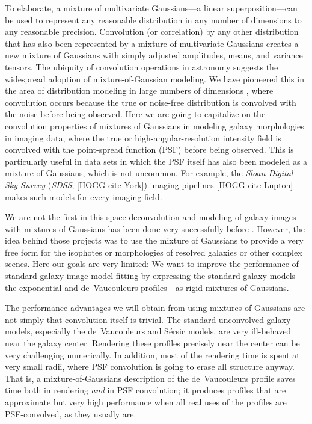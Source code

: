 \documentclass[12pt,pdftex,preprint]{aastex}
\newcommand{\project}[1]{\textsl{#1}}
\newcommand{\sdss}{\project{SDSS}}
\begin{document}
To elaborate, a mixture of multivariate Gaussians---a linear
superposition---can be used to represent any reasonable distribution
in any number of dimensions to any reasonable precision.  Convolution
(or correlation) by any other distribution that has also been
represented by a mixture of multivariate Gaussians creates a new
mixture of Gaussians with simply adjusted amplitudes, means, and
variance tensors.  The ubiquity of convolution operations in astronomy
suggests the widespread adoption of mixture-of-Gaussian modeling.  We
have pioneered this in the area of distribution modeling in large
numbers of dimensions \citep{xd, xdqso, xdqsoz}, where convolution
occurs because the true or noise-free distribution is convolved with
the noise before being observed.  Here we are going to capitalize on
the convolution properties of mixtures of Gaussians in modeling galaxy
morphologies in imaging data, where the true or
high-angular-resolution intensity field is convolved with the
point-spread function (PSF) before being observed.  This is
particularly useful in data sets in which the PSF itself has also been
modeled as a mixture of Gaussians, which is not uncommon.  For
example, the \project{Sloan Digital Sky Survey} (\sdss; [HOGG cite
  York]) imaging pipelines [HOGG cite Lupton] makes such models for
every imaging field.

We are not the first in this space deconvolution and modeling of
galaxy images with mixtures of Gaussians has been done very
successfully before \citep[for example,][]{bendinelli, emsellem,
  bendinelli2, cappellari}.  However, the idea behind those projects
was to use the mixture of Gaussians to provide a very free form for
the isophotes or morphologies of resolved galaxies or other complex
scenes.  Here our goals are very limited: We want to improve the
performance of standard galaxy image model fitting by expressing the
standard galaxy models---the exponential and de~Vaucouleurs
profiles---as rigid mixtures of Gaussians.

The performance advantages we will obtain from using mixtures of
Gaussians are not simply that convolution itself is trivial.  The
standard unconvolved galaxy models, especially the de~Vaucouleurs and
S\'ersic models, are very ill-behaved near the galaxy center.
Rendering these profiles precisely near the center can be very
challenging numerically.  In addition, most of the rendering time is
spent at very small radii, where PSF convolution is going to erase all
structure anyway.  That is, a mixture-of-Gaussians description of the
de~Vaucouleurs profile saves time both in rendering \emph{and} in PSF
convolution; it produces profiles that are approximate but very high
performance when all real uses of the profiles are PSF-convolved, as
they usually are.
\end{document}
